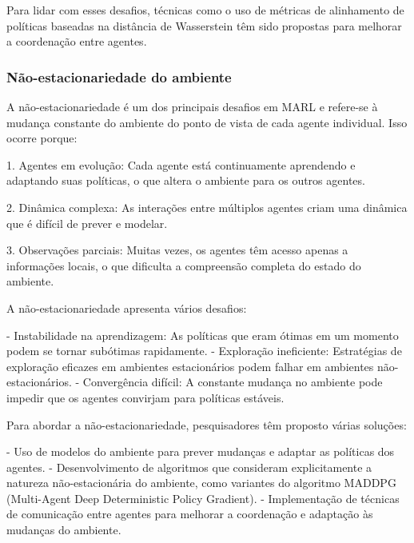 Para lidar com esses desafios, técnicas como o uso de métricas de alinhamento de políticas baseadas na distância de Wasserstein têm sido propostas para melhorar a coordenação entre agentes\cite{https://arxiv.org/abs/2401.10949}.

\subsubsection{Não-estacionariedade do ambiente}
\label{subsubsec:nao_estacionariedade}

A não-estacionariedade é um dos principais desafios em MARL e refere-se à mudança constante do ambiente do ponto de vista de cada agente individual\cite{https://arxiv.org/abs/2412.21088,https://www.semanticscholar.org/paper/96c58672ee781bf75246a039d781e2dc8af5f43e}. Isso ocorre porque:

1. Agentes em evolução: Cada agente está continuamente aprendendo e adaptando suas políticas, o que altera o ambiente para os outros agentes\cite{https://arxiv.org/abs/2412.20523}.

2. Dinâmica complexa: As interações entre múltiplos agentes criam uma dinâmica que é difícil de prever e modelar\cite{https://arxiv.org/abs/2410.21290}.

3. Observações parciais: Muitas vezes, os agentes têm acesso apenas a informações locais, o que dificulta a compreensão completa do estado do ambiente\cite{https://arxiv.org/abs/2410.21290}.

A não-estacionariedade apresenta vários desafios:

- Instabilidade na aprendizagem: As políticas que eram ótimas em um momento podem se tornar subótimas rapidamente.
- Exploração ineficiente: Estratégias de exploração eficazes em ambientes estacionários podem falhar em ambientes não-estacionários.
- Convergência difícil: A constante mudança no ambiente pode impedir que os agentes convirjam para políticas estáveis.

Para abordar a não-estacionariedade, pesquisadores têm proposto várias soluções:

- Uso de modelos do ambiente para prever mudanças e adaptar as políticas dos agentes\cite{https://www.semanticscholar.org/paper/96c58672ee781bf75246a039d781e2dc8af5f43e}.
- Desenvolvimento de algoritmos que consideram explicitamente a natureza não-estacionária do ambiente, como variantes do algoritmo MADDPG (Multi-Agent Deep Deterministic Policy Gradient)\cite{https://arxiv.org/abs/2410.21290}.
- Implementação de técnicas de comunicação entre agentes para melhorar a coordenação e adaptação às mudanças do ambiente\cite{https://arxiv.org/abs/2410.21290}.

